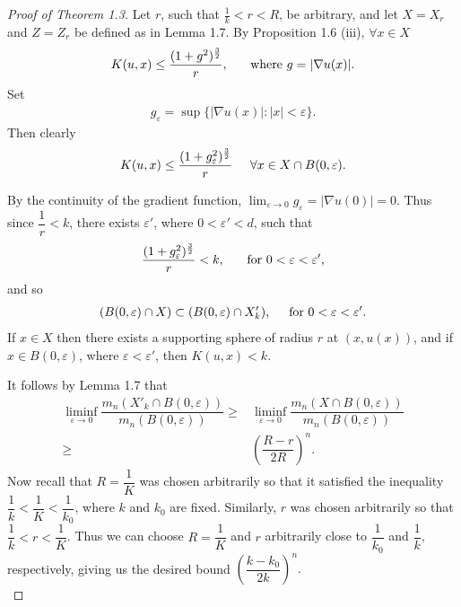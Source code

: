 \documentclass[10pt]{article}
\begin{document}
\begin{proof}[Proof of Theorem 1.3]
Let $r$, such that $\frac{1}{k}<r<R$, be arbitrary, and let $X=X_{r}$ and $Z=Z_{r}$ be defined as in Lemma 1.7. By Proposition 1.6 (iii), $\forall x \in X$
\begin{align*}
K(u,x)\leq \dfrac{(1+g^{2})^{\frac{3}{2}}}{r}, \hspace{5mm} \text{ where }g=|\nabla u(x)|.
\end{align*}
Set 
\begin{align*}
g_{\varepsilon}=\sup\{|\nabla u(x)| : |x|<\varepsilon\}.
\end{align*} Then clearly $$K(u,x) \leq \dfrac{(1+ g_{\varepsilon}^{2})^{\frac{3}{2}}}{r} \hspace{5mm} \forall x\in X\cap B(0,\varepsilon).$$

By the continuity of the gradient function, $\lim_{\varepsilon\rightarrow 0} g_{\varepsilon}=|\nabla u(0)|=0$. Thus since $\dfrac{1}{r} < k$, there exists $\varepsilon'$, where $0<\varepsilon'< d$, such that 
\begin{align*}
\dfrac{(1+ g_{\varepsilon}^{2})^{\frac{3}{2}}}{r}<k, \hspace{5mm} \text{ for } 0<\varepsilon<\varepsilon', 
\end{align*}
and so
\begin{align*}
(B(0,\varepsilon)\cap X)\subset (B(0,\varepsilon)\cap X'_{k}), \hspace{5mm} \text{for } 0<\varepsilon<\varepsilon'.
\end{align*}
If $x\in X$ then there exists a supporting sphere of radius $r$ at $(x,u(x))$, and if $x \in B(0,\varepsilon)$, where $\varepsilon <\varepsilon'$, then $K(u,x)<k$.

It follows by Lemma 1.7 that
\begin{align*}
\liminf_{\varepsilon\rightarrow 0}\dfrac{m_{n}(X'_{k}\cap B(0,\varepsilon))}{m_{n}(B(0,\varepsilon))} \geq & \liminf_{\varepsilon\rightarrow 0}\dfrac{m_{n}(X\cap B(0,\varepsilon))}{m_{n}(B(0,\varepsilon))}\\
\geq & \left( \dfrac{R-r}{2R} \right)^n.
\end{align*}
Now recall that $R=\dfrac{1}{K}$ was chosen arbitrarily so that it satisfied the inequality $\dfrac{1}{k} <\dfrac{1}{K}<\dfrac{1}{k_0}$, where $k$ and $k_0$ are fixed. Similarly, $r$ was chosen arbitrarily so that $\dfrac{1}{k} < r <\dfrac{1}{K}$. Thus we can choose $R=\dfrac{1}{K}$ and $r$ arbitrarily close to $\dfrac{1}{k_0}$ and $\dfrac{1}{k}$, respectively, giving us the desired bound $\left(\dfrac{k-k_0}{2k}\right)^{n}.$ \\


\end{proof}
\end{document}
